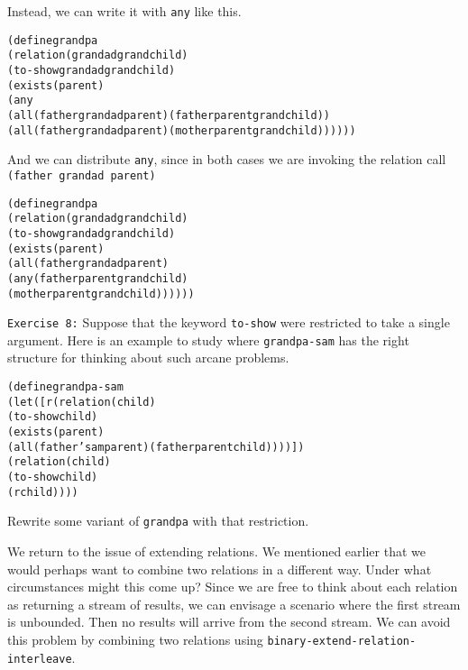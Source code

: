 Instead, we can write it with \texttt{any} like this.

\begin{alltt}
(define grandpa
  (relation (grandad grandchild)
    (to-show grandad grandchild)
    (exists (parent)
      (any
        (all (father grandad parent) (father parent grandchild))
        (all (father grandad parent) (mother parent grandchild))))))
\end{alltt}

And we can distribute \texttt{any}, since in both cases we are
invoking the relation call \texttt{(father grandad parent)}
\begin{alltt}
(define grandpa
  (relation (grandad grandchild)
    (to-show grandad grandchild)
    (exists (parent)
      (all (father grandad parent)
           (any (father parent grandchild)
                (mother parent grandchild))))))
\end{alltt}

\noindent
\texttt{Exercise 8:} Suppose that the keyword \texttt{to-show} were
restricted to take a single argument.  Here is an example to study
where \texttt{grandpa-sam} has the right structure for thinking
about such arcane problems.

\begin{alltt}
(define grandpa-sam
  (let ([r (relation (child)
             (to-show child)
             (exists (parent)
               (all (father 'sam parent) (father parent child))))])
    (relation (child)
      (to-show child)
      (r child))))
\end{alltt}
Rewrite some variant of \texttt{grandpa} with that restriction.\endofexercise

We return to the issue of extending relations.  We mentioned earlier
that we would perhaps want to combine two relations in a different
way.  Under what circumstances might this come up?  Since we are free
to think about each relation as returning a stream of results, we can
envisage a scenario where the first stream is unbounded.  Then no
results will arrive from the second stream.  We can avoid this problem
by combining two relations using \texttt{binary-extend-relation-interleave}.

